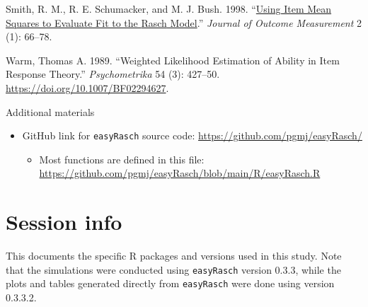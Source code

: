 \documentclass[
  letterpaper,
  DIV=11,
  numbers=noendperiod]{scrartcl}
\providecommand{\tightlist}{%
  \setlength{\itemsep}{0pt}\setlength{\parskip}{0pt}}\usepackage{longtable,booktabs,array}
\newlength{\cslhangindent}
\newenvironment{CSLReferences}[2] %
 {\begin{list}{}{%
  \setlength{\itemindent}{0pt}
  \setlength{\leftmargin}{0pt}
  \setlength{\parsep}{0pt}
  \ifodd #1
   \setlength{\leftmargin}{\cslhangindent}
   \setlength{\itemindent}{-1\cslhangindent}
  \fi
  \setlength{\itemsep}{#2\baselineskip}}}
 {\end{list}}
\begin{document}
\begin{CSLReferences}{1}{0}
Smith, R. M., R. E. Schumacker, and M. J. Bush. 1998.
{``\href{https://www.ncbi.nlm.nih.gov/pubmed/9661732}{Using Item Mean
Squares to Evaluate Fit to the {Rasch} Model}.''} \emph{Journal of
Outcome Measurement} 2 (1): 66--78.

Warm, Thomas A. 1989. {``Weighted Likelihood Estimation of Ability in
Item Response Theory.''} \emph{Psychometrika} 54 (3): 427--50.
\url{https://doi.org/10.1007/BF02294627}.

\end{CSLReferences}

Additional materials

\begin{itemize}
\tightlist
\item
  GitHub link for \texttt{easyRasch} source code:
  \url{https://github.com/pgmj/easyRasch/}

  \begin{itemize}
  \tightlist
  \item
    Most functions are defined in this file:
    \url{https://github.com/pgmj/easyRasch/blob/main/R/easyRasch.R}
  \end{itemize}
\end{itemize}

\section{Session info}\label{session-info}

This documents the specific R packages and versions used in this study.
Note that the simulations were conducted using \texttt{easyRasch}
version 0.3.3, while the plots and tables generated directly from
\texttt{easyRasch} were done using version 0.3.3.2.
\end{document}
